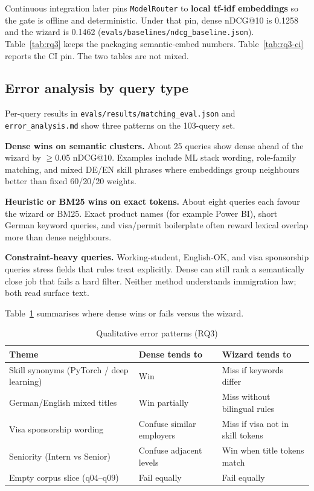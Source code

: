 Continuous integration later pins \texttt{ModelRouter} to \textbf{local tf-idf embeddings} so the gate is offline and deterministic. Under that pin, dense nDCG@10 is 0.1258 and the wizard is 0.1462 (\texttt{evals/baselines/ndcg\_baseline.json}). Table~\ref{tab:rq3} keeps the packaging semantic-embed numbers. Table~\ref{tab:rq3-ci} reports the CI pin. The two tables are not mixed.

\subsection{Error analysis by query type}
\label{sec:error-analysis}

Per-query results in \texttt{evals/results/matching\_eval.json} and \texttt{error\_analysis.md} show three patterns on the 103-query set.

\textbf{Dense wins on semantic clusters.} About 25 queries show dense ahead of the wizard by $\geq$0.05 nDCG@10. Examples include ML stack wording, role-family matching, and mixed DE/EN skill phrases where embeddings group neighbours better than fixed 60/20/20 weights.

\textbf{Heuristic or BM25 wins on exact tokens.} About eight queries each favour the wizard or BM25. Exact product names (for example Power BI), short German keyword queries, and visa/permit boilerplate often reward lexical overlap more than dense neighbours.

\textbf{Constraint-heavy queries.} Working-student, English-OK, and visa sponsorship queries stress fields that rules treat explicitly. Dense can still rank a semantically close job that fails a hard filter. Neither method understands immigration law; both read surface text.

Table~\ref{tab:error-patterns} summarises where dense wins or fails versus the wizard.

\begin{table}[ht]
\centering
\caption{Qualitative error patterns (RQ3)}
\label{tab:error-patterns}
\begin{tabularx}{\textwidth}{@{}lXX@{}}
\toprule
\textbf{Theme} & \textbf{Dense tends to} & \textbf{Wizard tends to} \\
\midrule
Skill synonyms (PyTorch / deep learning) & Win & Miss if keywords differ \\
German/English mixed titles & Win partially & Miss without bilingual rules \\
Visa sponsorship wording & Confuse similar employers & Miss if visa not in skill tokens \\
Seniority (Intern vs Senior) & Confuse adjacent levels & Win when title tokens match \\
Empty corpus slice (q04--q09) & Fail equally & Fail equally \\
\bottomrule
\end{tabularx}
\end{table}

